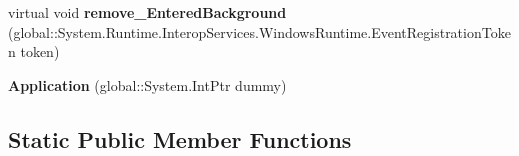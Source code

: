 \begin{DoxyCompactItemize}
\item 
\mbox{\label{class_windows_1_1_u_i_1_1_xaml_1_1_application_a09062e367c18c1fcc02e683a68c8f793}} 
virtual void {\bfseries remove\+\_\+\+Entered\+Background} (global\+::\+System.\+Runtime.\+Interop\+Services.\+Windows\+Runtime.\+Event\+Registration\+Token token)
\item 
\mbox{\label{class_windows_1_1_u_i_1_1_xaml_1_1_application_a90eb3297ba9bfe5ad1c0d720af9b8066}} 
{\bfseries Application} (global\+::\+System.\+Int\+Ptr dummy)
\end{DoxyCompactItemize}
\subsection*{Static Public Member Functions}
